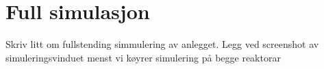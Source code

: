 \section{Full simulasjon}
\thispagestyle{fancy}

Skriv litt om fullstending simmulering av anlegget.
Legg ved screenshot av simuleringsvinduet menst vi køyrer simulering på begge reaktorar